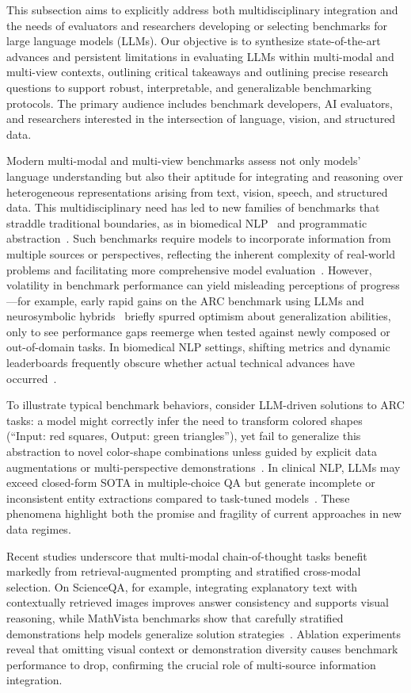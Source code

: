 \documentclass[sigconf]{acmart}
\begin{document}
This subsection aims to explicitly address both multidisciplinary integration and the needs of evaluators and researchers developing or selecting benchmarks for large language models (LLMs). Our objective is to synthesize state-of-the-art advances and persistent limitations in evaluating LLMs within multi-modal and multi-view contexts, outlining critical takeaways and outlining precise research questions to support robust, interpretable, and generalizable benchmarking protocols. The primary audience includes benchmark developers, AI evaluators, and researchers interested in the intersection of language, vision, and structured data.

Modern multi-modal and multi-view benchmarks assess not only models' language understanding but also their aptitude for integrating and reasoning over heterogeneous representations arising from text, vision, speech, and structured data. This multidisciplinary need has led to new families of benchmarks that straddle traditional boundaries, as in biomedical NLP~\cite{ref94,ref95} and programmatic abstraction~\cite{ref92}. Such benchmarks require models to incorporate information from multiple sources or perspectives, reflecting the inherent complexity of real-world problems and facilitating more comprehensive model evaluation~\cite{ref79}. However, volatility in benchmark performance can yield misleading perceptions of progress---for example, early rapid gains on the ARC benchmark using LLMs and neurosymbolic hybrids~\cite{ref92} briefly spurred optimism about generalization abilities, only to see performance gaps reemerge when tested against newly composed or out-of-domain tasks. In biomedical NLP settings, shifting metrics and dynamic leaderboards frequently obscure whether actual technical advances have occurred~\cite{ref94,ref95}.

To illustrate typical benchmark behaviors, consider LLM-driven solutions to ARC tasks: a model might correctly infer the need to transform colored shapes (``Input: red squares, Output: green triangles''), yet fail to generalize this abstraction to novel color-shape combinations unless guided by explicit data augmentations or multi-perspective demonstrations~\cite{ref92}. In clinical NLP, LLMs may exceed closed-form SOTA in multiple-choice QA but generate incomplete or inconsistent entity extractions compared to task-tuned models~\cite{ref94}. These phenomena highlight both the promise and fragility of current approaches in new data regimes.

Recent studies underscore that multi-modal chain-of-thought tasks benefit markedly from retrieval-augmented prompting and stratified cross-modal selection. On ScienceQA, for example, integrating explanatory text with contextually retrieved images improves answer consistency and supports visual reasoning, while MathVista benchmarks show that carefully stratified demonstrations help models generalize solution strategies~\cite{ref85}. Ablation experiments reveal that omitting visual context or demonstration diversity causes benchmark performance to drop, confirming the crucial role of multi-source information integration.
\end{document}
